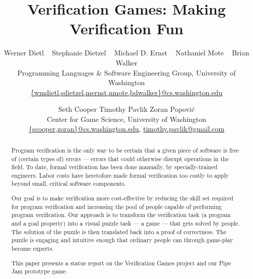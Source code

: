 \documentclass[preprint]{sig-alternate}
\begin{document}
\title{Verification Games: Making Verification Fun}



\author{
Werner Dietl
\ \quad
Stephanie Dietzel
\ \quad
Michael D. Ernst
\ \quad
Nathaniel Mote
\ \quad
Brian Walker\\
%
{\normalsize
Programming Languages \& Software Engineering Group,
University of Washington}\\
\url{{wmdietl,sdietzel,mernst,nmote,bdwalker}@cs.washington.edu}
%
\and
%
Seth Cooper
\qquad
Timothy Pavlik
\qquad
Zoran Popovi\'c\\
%
{\normalsize
Center for Game Science, University of Washington}\\
\url{{scooper,zoran}@cs.washington.edu},
\url{timothy.pavlik@gmail.com}
}

\date{}

\maketitle

\begin{abstract}
Program verification is the only way to be certain that a given
piece of software is free of (certain types of) errors --- errors that
could otherwise disrupt operations in the field.  To date, formal
verification has been done manually, by specially-trained engineers.  Labor
costs have heretofore made formal verification too costly to apply beyond
small, critical software components.

Our goal is to make verification more cost-effective by reducing the skill
set required for program verification and increasing the pool of people
capable of performing program verification.  Our approach is to transform
the verification task (a program and a goal property)
into a visual puzzle task --- a game --- that
gets solved by people. The solution of the puzzle is then translated
back into a proof of correctness.
The puzzle is engaging and intuitive enough that ordinary people can through
game-play become experts.

This paper presents a 
status report on the Verification Games
project and our Pipe Jam prototype game.



\end{abstract}

\end{document}
